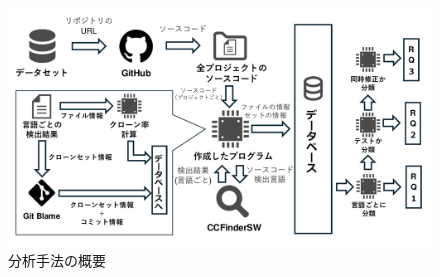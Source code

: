 \documentclass[T,J]{fose}
\begin{document}


\begin{figure}
    \centering
    \includegraphics[width=0.8\linewidth]{images/overviewOfMethod.pdf}
    \caption{分析手法の概要}
    \label{fig:overviewOfMethod}
\end{figure}

\end{document}
